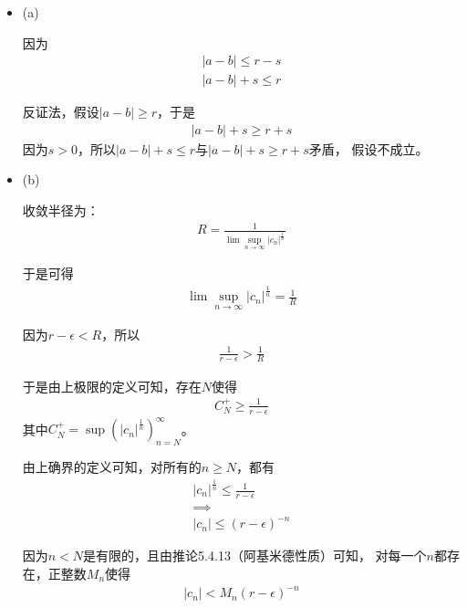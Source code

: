 \documentclass{article}
\begin{document}
\begin{itemize}
  \item (a)

        因为
        \begin{align*}
          |a - b|     \leq r - s \\
          |a - b| + s  \leq r
        \end{align*}

        反证法，假设$|a - b| \geq r$，于是
        \begin{align*}
          |a - b| + s \geq r + s
        \end{align*}
        因为$s > 0$，所以$|a - b| + s  \leq r$与$|a - b| + s \geq r + s$矛盾，
        假设不成立。

  \item (b)

        收敛半径为：
        \begin{align*}
          R = \frac{1}{\lim\sup\limits_{n \to \infty} |c_n|^\frac{1}{n}}
        \end{align*}

        于是可得
        \begin{align*}
          \lim\sup\limits_{n \to \infty} |c_n|^\frac{1}{n} = \frac{1}{R}
        \end{align*}

        因为$r - \epsilon < R$，所以
        \begin{align*}
          \frac{1}{r - \epsilon} > \frac{1}{R}
        \end{align*}

        于是由上极限的定义可知，存在$N$使得
        \begin{align*}
          C_N^+ \geq \frac{1}{r - \epsilon}
        \end{align*}
        其中$C_N^+ = \sup(|c_n|^\frac{1}{n})_{n = N}^\infty$。

        由上确界的定义可知，对所有的$n \geq N$，都有
        \begin{align*}
          |c_n|^\frac{1}{n} \leq \frac{1}{r - \epsilon} \\
          \implies                                      \\
          |c_n| \leq (r - \epsilon)^{-n}
        \end{align*}

        因为$n < N$是有限的，且由推论5.4.13（阿基米德性质）可知，
        对每一个$n$都存在，正整数$M_n$使得
        \begin{align*}
          |c_n| < M_n (r - \epsilon)^{-n}
        \end{align*}


\end{itemize}
\end{document}

